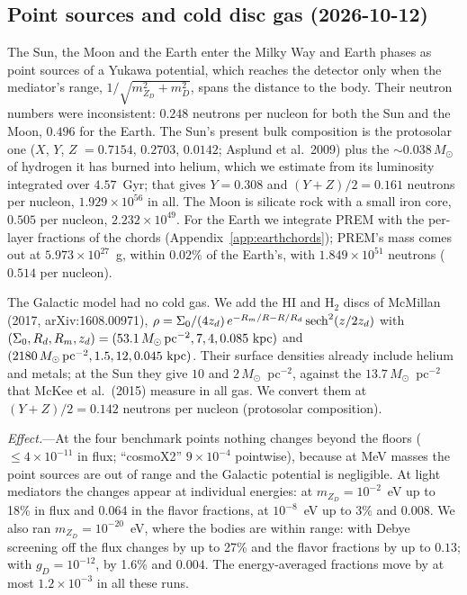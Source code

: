 \documentclass[11pt,a4paper]{article}
\newcommand{\mzd}{m_{Z_D}}
\newcommand{\gd}{g_D}
\begin{document}
\subsection{Point sources and cold disc gas (2026-10-12)}
\label{app:pointsources}

The Sun, the Moon and the Earth enter the Milky Way and Earth phases as point sources of a Yukawa
potential, which reaches the detector only when the mediator's range, $1/\sqrt{\mzd^2+m_D^2}$,
spans the distance to the body. Their neutron numbers were inconsistent: $0.248$ neutrons per
nucleon for both the Sun and the Moon, $0.496$ for the Earth. The Sun's present bulk composition
is the protosolar one ($X$, $Y$, $Z$ $= 0.7154$, $0.2703$, $0.0142$; Asplund et al.\ 2009) plus the
$\sim0.038\,M_\odot$ of hydrogen it has burned into helium, which we estimate from its luminosity
integrated over $4.57$~Gyr; that gives $Y = 0.308$ and $(Y+Z)/2 = 0.161$ neutrons per nucleon,
$1.929\times10^{56}$ in all. The Moon is silicate rock with a small iron core, $0.505$ per
nucleon, $2.232\times10^{49}$. For the Earth we integrate PREM with the per-layer fractions of
the chords (Appendix~\ref{app:earthchords}); PREM's mass comes out at $5.973\times10^{27}$~g,
within $0.02\%$ of the Earth's, with $1.849\times10^{51}$ neutrons ($0.514$ per nucleon).

The Galactic model had no cold gas. We add the HI and H$_2$ discs of McMillan (2017,
arXiv:1608.00971), $\rho = \Sigma_0/(4z_d)\,e^{-R_m/R - R/R_d}\,{\rm sech}^2(z/2z_d)$ with
$(\Sigma_0, R_d, R_m, z_d) = (53.1\,M_\odot\,{\rm pc}^{-2}, 7, 4, 0.085~{\rm kpc})$ and
$(2180\,M_\odot\,{\rm pc}^{-2}, 1.5, 12, 0.045~{\rm kpc})$. Their surface densities already
include helium and metals; at the Sun they give $10$ and $2\,M_\odot$~pc$^{-2}$, against the
$13.7\,M_\odot$~pc$^{-2}$ that McKee et al.\ (2015) measure in all gas. We convert them at
$(Y+Z)/2 = 0.142$ neutrons per nucleon (protosolar composition).

\textit{Effect.}---At the four benchmark points nothing changes beyond the floors
($\le4\times10^{-11}$ in flux; ``cosmoX2'' $9\times10^{-4}$ pointwise), because at MeV masses the
point sources are out of range and the Galactic potential is negligible. At light mediators the
changes appear at individual energies: at $\mzd = 10^{-2}$~eV up to 18\% in flux and $0.064$ in
the flavor fractions, at $10^{-8}$~eV up to 3\% and $0.008$. We also ran $\mzd = 10^{-20}$~eV,
where the bodies are within range: with Debye screening off the flux changes by up to 27\% and
the flavor fractions by up to $0.13$; with $\gd = 10^{-12}$, by 1.6\% and $0.004$. The
energy-averaged fractions move by at most $1.2\times10^{-3}$ in all these runs.
\end{document}
